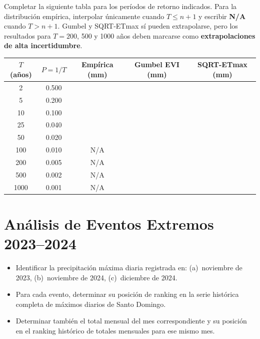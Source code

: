 \documentclass[11pt]{article}
\begin{document}
Completar la siguiente tabla para los períodos de retorno indicados. Para la
distribución empírica, interpolar únicamente cuando $T\leq n+1$ y escribir
\textbf{N/A} cuando $T>n+1$. Gumbel y SQRT-ETmax sí pueden extrapolarse, pero
los resultados para $T=200$, 500 y 1000 años deben marcarse como
\textbf{extrapolaciones de alta incertidumbre}.
\vfill
\begin{center}
\small
{}
\begin{tabular}{ccccc}
\toprule
$T$ (años) & $P = 1/T$ & Empírica (mm) & Gumbel EVI (mm) & SQRT-ETmax (mm) \\
\midrule
2    & 0.500  & & & \\
5    & 0.200  & & & \\
10   & 0.100  & & & \\
25   & 0.040  & & & \\
50   & 0.020  & & & \\
100  & 0.010  & N/A & & \\
200  & 0.005  & N/A & & \\
500  & 0.002  & N/A & & \\
1000 & 0.001  & N/A & & \\
\bottomrule
\end{tabular}

\end{center}

\section{Análisis de Eventos Extremos 2023--2024}


\begin{itemize}
  \item Identificar la precipitación máxima diaria registrada en:
    (a)~noviembre de 2023, (b)~noviembre de 2024, (c)~diciembre de 2024.
  \item Para cada evento, determinar su posición de ranking en la serie
    histórica completa de máximos diarios de Santo Domingo.
  \item Determinar también el total mensual del mes correspondiente y su
    posición en el ranking histórico de totales mensuales para ese mismo mes.
\end{itemize}
\end{document}
